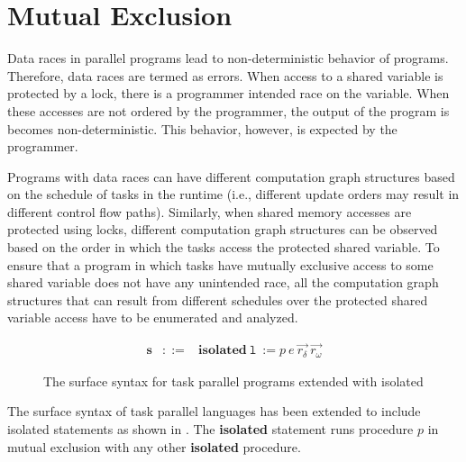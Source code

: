 \section{Mutual Exclusion} \label{sec:mutex}

Data races in parallel programs lead to non-deterministic behavior of programs. Therefore, data races are termed as errors. When access to a shared variable is protected by a lock, there is a programmer intended race on the variable. When these accesses are not ordered by the programmer, the output of the program is becomes non-deterministic. This behavior, however, is expected by the programmer. 

Programs with data races can have different computation graph structures based on the schedule of tasks in the runtime (i.e., different update orders may result in different control flow paths). Similarly, when shared memory accesses are protected using locks, different computation graph structures can be observed based on the order in which the tasks access the protected shared variable. To ensure that a program in which tasks have mutually exclusive access to some shared variable does not have any unintended race, all the computation graph structures that can result from different schedules over the protected shared variable access have to be enumerated and analyzed.

\begin{figure}[h]
\vspace{-1em}
  \begin{center}
\[
  \begin{array}{rcl}
\textbf{s} &::=& \textbf{isolated}~\texttt{l}\ := p~e~\vec{r_\delta}~\vec{r_\omega}
  \end{array}
\]
  \end{center}
  \caption{The surface syntax for task parallel programs extended with isolated}
  \label{fig:syntax-iso}
\end{figure}

The surface syntax of task parallel languages has been extended to include isolated statements as shown in . 
The \textbf{isolated} statement runs procedure $p$ in mutual exclusion with any other \textbf{isolated} procedure.


